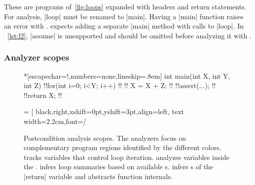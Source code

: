 These are programs of~\autoref{fig:loops} expanded with headers and return statements. For  analysis, \pr|loop| must be
renamed to \pr|main|. Having a \pr|main| function raises an error with
\@.  expects adding a separate \pr|main| method with calls
to \pr|loop|. In ~\autoref{lst:l2}, \pr|assume| is unsupported and should be
omitted before analyzing it with \@.

\subsubsection{Analyzer scopes}\label{subsec:analyzer-scopes}

\begin{figure}[H]
\begin{center}
\begin{minipage}{.7\textwidth}
\begin{outlisting}*[escapechar=!,numbers=none,lineskip=.8em]
int main(int X, int Y, int Z) {
    !!for(int i=0; i<Y; i++)              !!
    !!   X = X + Z;                       !!
    !!assert(...);                        !!
    !!return X;                           !!
}
\end{outlisting}
 = [
    black,right,xshift=0pt,yshift=3pt,align=left,
    text width=2.2cm,font=\itshape]
\end{minipage}
\end{center}
\caption[Postcondition analysis scopes]{
Postcondition analysis scopes. The analyzers focus on
complementary program regions identified by the different colors. 
tracks variables that control loop iteration. \ndx{\impl} analyzes variables
inside the .  infers loop summaries based on available
s.  infers s of the \pr|return|
variable and abstracts function internals.
}
\label{fig:comp-scope}
\end{figure}%

